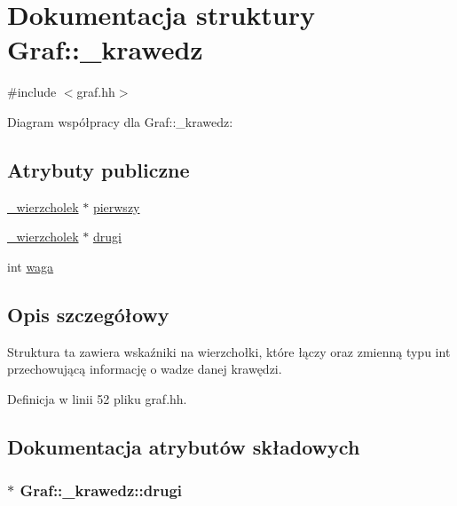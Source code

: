 \hypertarget{struct_graf_1_1__krawedz}{\section{\-Dokumentacja struktury \-Graf\-:\-:\-\_\-krawedz}
\label{struct_graf_1_1__krawedz}
}


{\ttfamily \#include $<$graf.\-hh$>$}



\-Diagram współpracy dla \-Graf\-:\-:\-\_\-krawedz\-:
\subsection*{\-Atrybuty publiczne}
\begin{DoxyCompactItemize}
\item 
\hyperlink{struct_graf_1_1__wierzcholek}{\-\_\-wierzcholek} $\ast$ \hyperlink{struct_graf_1_1__krawedz_adba487ff1b27ab413c139dff7ef02313}{pierwszy}
\item 
\hyperlink{struct_graf_1_1__wierzcholek}{\-\_\-wierzcholek} $\ast$ \hyperlink{struct_graf_1_1__krawedz_a089375425bc7f1cb193f02f7bae87e4a}{drugi}
\item 
int \hyperlink{struct_graf_1_1__krawedz_a32556165c01ba902034186551780c7f4}{waga}
\end{DoxyCompactItemize}


\subsection{\-Opis szczegółowy}
\-Struktura ta zawiera wskaźniki na wierzchołki, które łączy oraz zmienną typu int przechowującą informację o wadze danej krawędzi. 

\-Definicja w linii 52 pliku graf.\-hh.



\subsection{\-Dokumentacja atrybutów składowych}
\hypertarget{struct_graf_1_1__krawedz_a089375425bc7f1cb193f02f7bae87e4a}{
\subsubsection[{drugi}]{$\ast$ {\bf \-Graf\-::\-\_\-krawedz\-::drugi}}}\label{struct_graf_1_1__krawedz_a089375425bc7f1cb193f02f7bae87e4a}


